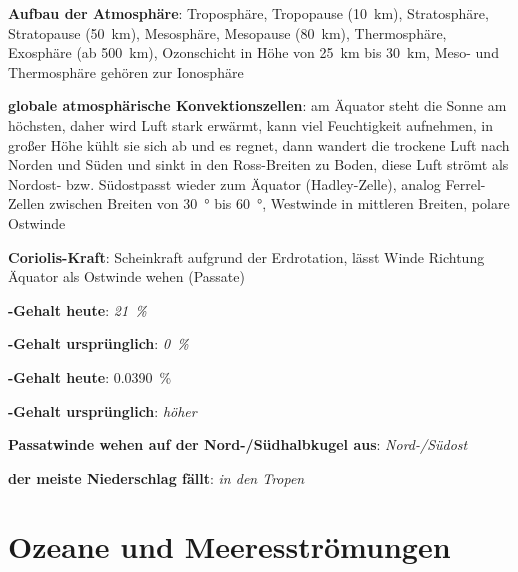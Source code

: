 \textbf{Aufbau der Atmosphäre}:
Troposphäre,
Tropopause (\SI{10}{\kilo\meter}),
Stratosphäre,\\
Stratopause (\SI{50}{\kilo\meter}),
Mesosphäre,
Mesopause (\SI{80}{\kilo\meter}),
Thermosphäre,
Exosphäre (ab \SI{500}{\kilo\meter}),
Ozonschicht in Höhe von \SI{25}{\kilo\meter} bis \SI{30}{\kilo\meter},
Meso- und Thermosphäre gehören zur Ionosphäre

\textbf{globale atmosphärische Konvektionszellen}:
am Äquator steht die Sonne am höchsten, daher wird Luft stark erwärmt,
kann viel Feuchtigkeit aufnehmen,
in großer Höhe kühlt sie sich ab und es regnet,
dann wandert die trockene Luft nach Norden und Süden und sinkt in den Ross-Breiten zu Boden,
diese Luft strömt als Nordost- bzw. Südostpasst wieder zum Äquator (Hadley-Zelle),
analog Ferrel-Zellen zwischen Breiten von \SI{30}{\degree} bis \SI{60}{\degree},
Westwinde in mittleren Breiten,
polare Ostwinde

\textbf{Coriolis-Kraft}:
Scheinkraft aufgrund der Erdrotation,
lässt Winde Richtung Äquator als Ostwinde wehen (Passate)

\begin{wichtig}
    \item
    \textbf{-Gehalt heute}:
    \emph{\SI[math-rm=\mathit,text-rm=\itshape]{21}{\percent}}

    \item
    \textbf{-Gehalt ursprünglich}:
    \emph{\SI[math-rm=\mathit,text-rm=\itshape]{0}{\percent}}

    \item
    \textbf{-Gehalt heute}:
    \SI[math-rm=\mathit,text-rm=\itshape]{0.0390}{\percent}

    \item
    \textbf{-Gehalt ursprünglich}:
    \emph{höher}

    \item
    \textbf{Passatwinde wehen auf der Nord-/Südhalbkugel aus}:
    \emph{Nord-/Südost}

    \item
    \textbf{der meiste Niederschlag fällt}:
    \emph{in den Tropen}
\end{wichtig}

\pagebreak

\section{%
    Ozeane und Meeresströmungen%
}

